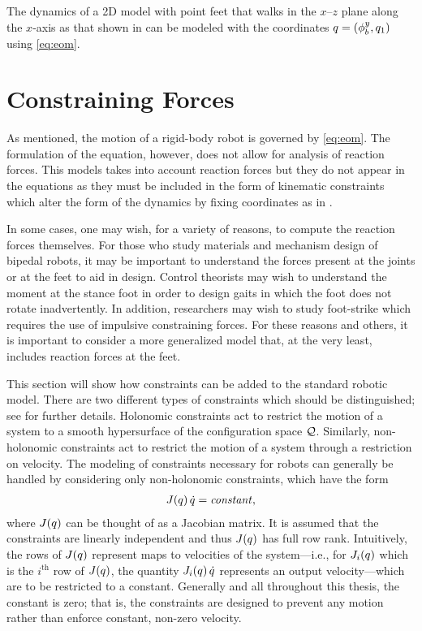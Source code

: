 \begin{exmp}
  \label{ex:compass_gait_reduced_coordinates}
  The dynamics of a 2D model with point feet that walks in the
  $x$--$z$ plane along the $x$-axis as that shown in
   can be modeled with the
  coordinates $q = (\phi_{b}^{y}, q_{1})$ using \eqref{eq:eom}.
\end{exmp}


\section{Constraining Forces}

As mentioned, the motion of a rigid-body robot is governed by \eqref{eq:eom}.
%
The formulation of the equation, however, does not allow for analysis of
reaction forces.
%
This models takes into account reaction forces but they do not appear in the
equations as they must be included in the form of kinematic constraints which
alter the form of the dynamics by fixing coordinates as in .

In some cases, one may wish, for a variety of reasons, to compute the reaction
forces themselves.
%
For those who study materials and mechanism design of bipedal robots, it may be
important to understand the forces present at the joints or at the feet to aid
in design.
%
Control theorists may wish to understand the moment at the stance foot in order
to design gaits in which the foot does not rotate inadvertently.
%
In addition, researchers may wish to study foot-strike which requires the use of
impulsive constraining forces.
%
For these reasons and others, it is important to consider a more generalized
model that, at the very least, includes reaction forces at the feet.

This section will show how constraints can be added to the standard robotic
model.
%
There are two different types of constraints which should be distinguished; see
\cite[Ch. 6]{Murray1994} for further details.
%
Holonomic constraints act to restrict the motion of a system to a smooth
hypersurface of the configuration space $\mathcal{Q}$.
%
Similarly, non-holonomic constraints act to restrict the motion of a system
through a restriction on velocity.
%
The modeling of constraints necessary for robots can generally be handled by
considering only non-holonomic constraints, which have the form
\begin{align}
  \label{eq:holocon}
  J(q) \, \dot{q} = \mathit{constant},
\end{align}
where $J(q)$ can be thought of as a Jacobian matrix.
%
It is assumed that the constraints are linearly independent and thus $J(q)$
has full row rank.
%
Intuitively, the rows of $J(q)$ represent maps to velocities of the
system---i.e., for $J_{i}(q)$ which is the $i^{\mathrm{th}}$ row of $J(q)$,
the quantity $J_{i}(q) \, \dot{q}$ represents an output velocity---which are to
be restricted to a constant.
%
Generally and all throughout this thesis, the constant is zero; that is, the
constraints are designed to prevent any motion rather than enforce constant,
non-zero velocity.

